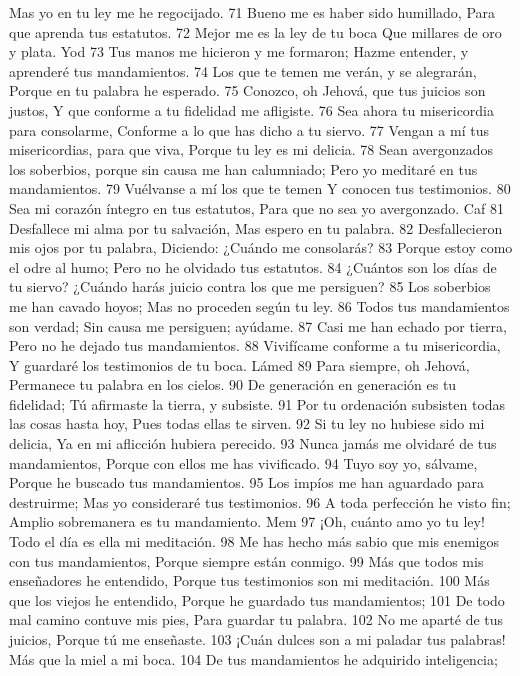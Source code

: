 Mas yo en tu ley me he regocijado.
71 Bueno me es haber sido humillado,
Para que aprenda tus estatutos.
72 Mejor me es la ley de tu boca
Que millares de oro y plata.
Yod
73 Tus manos me hicieron y me formaron;
Hazme entender, y aprenderé tus mandamientos.
74 Los que te temen me verán, y se alegrarán,
Porque en tu palabra he esperado.
75 Conozco, oh Jehová, que tus juicios son justos,
Y que conforme a tu fidelidad me afligiste.
76 Sea ahora tu misericordia para consolarme,
Conforme a lo que has dicho a tu siervo.
77 Vengan a mí tus misericordias, para que viva,
Porque tu ley es mi delicia.
78 Sean avergonzados los soberbios, porque sin causa me han calumniado;
Pero yo meditaré en tus mandamientos.
79 Vuélvanse a mí los que te temen
Y conocen tus testimonios.
80 Sea mi corazón íntegro en tus estatutos,
Para que no sea yo avergonzado.
Caf
81 Desfallece mi alma por tu salvación,
Mas espero en tu palabra.
82 Desfallecieron mis ojos por tu palabra,
Diciendo: ¿Cuándo me consolarás?
83 Porque estoy como el odre al humo;
Pero no he olvidado tus estatutos.
84 ¿Cuántos son los días de tu siervo?
¿Cuándo harás juicio contra los que me persiguen?
85 Los soberbios me han cavado hoyos;
Mas no proceden según tu ley.
86 Todos tus mandamientos son verdad;
Sin causa me persiguen; ayúdame.
87 Casi me han echado por tierra,
Pero no he dejado tus mandamientos.
88 Vivifícame conforme a tu misericordia,
Y guardaré los testimonios de tu boca.
Lámed
89 Para siempre, oh Jehová,
Permanece tu palabra en los cielos.
90 De generación en generación es tu fidelidad;
Tú afirmaste la tierra, y subsiste.
91 Por tu ordenación subsisten todas las cosas hasta hoy,
Pues todas ellas te sirven.
92 Si tu ley no hubiese sido mi delicia,
Ya en mi aflicción hubiera perecido.
93 Nunca jamás me olvidaré de tus mandamientos,
Porque con ellos me has vivificado.
94 Tuyo soy yo, sálvame,
Porque he buscado tus mandamientos.
95 Los impíos me han aguardado para destruirme;
Mas yo consideraré tus testimonios.
96 A toda perfección he visto fin;
Amplio sobremanera es tu mandamiento.
Mem
97 ¡Oh, cuánto amo yo tu ley!
Todo el día es ella mi meditación.
98 Me has hecho más sabio que mis enemigos con tus mandamientos,
Porque siempre están conmigo.
99 Más que todos mis enseñadores he entendido,
Porque tus testimonios son mi meditación.
100 Más que los viejos he entendido,
Porque he guardado tus mandamientos;
101 De todo mal camino contuve mis pies,
Para guardar tu palabra.
102 No me aparté de tus juicios,
Porque tú me enseñaste.
103 ¡Cuán dulces son a mi paladar tus palabras!
Más que la miel a mi boca.
104 De tus mandamientos he adquirido inteligencia;
